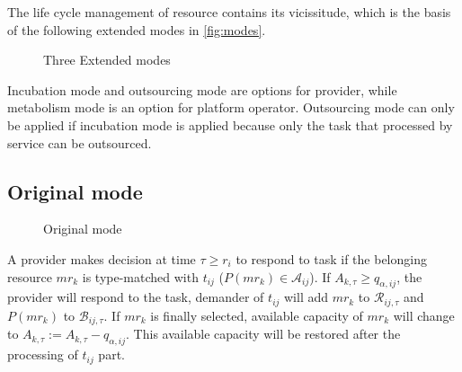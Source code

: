 The life cycle management of resource contains its vicissitude, which is the basis of the following extended modes in \autoref{fig:modes}.
\begin{figure}[htbp]
    \centering
    \resizebox{\textwidth}{!}{}
    \caption{Three Extended modes}
    \label{fig:modes}
\end{figure}
Incubation mode and outsourcing mode are options for provider, while metabolism mode is an option for platform operator. Outsourcing mode can only be applied if incubation mode is applied because only the task that processed by service can be outsourced.


\subsection{Original mode} %
\label{sub:interactions_and_decisions}

\begin{figure}[htbp]
    \centering
    \resizebox{0.9\textwidth}{!}{}
    \caption{Original mode}
    \label{fig:originmode}
\end{figure}

A provider makes decision at time $\tau\ge r_i$ to respond to task if the belonging resource $mr_k$ is type-matched with $t_{ij}$ ($P(mr_k)\in\mathcal{A}_{ij}$). If $A_{k,\tau} \ge q_{\alpha,ij}$, the provider will respond to the task, demander of $t_{ij}$ will add $mr_k$ to $\mathcal{R}_{ij,\tau}$ and $P(mr_k)$ to $\mathcal{B}_{ij,\tau}$. If $mr_k$ is finally selected, available capacity of $mr_k$ will change to $A_{k,\tau} := A_{k,\tau} - q_{\alpha,ij}$. This available capacity will be restored after the processing of $t_{ij}$ part.

